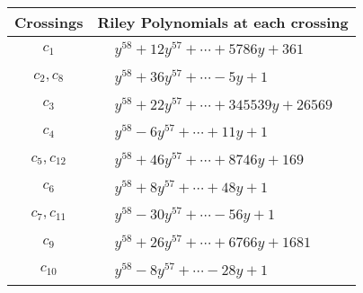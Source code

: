 \documentclass[1p]{elsarticle_modified}
\theoremstyle{definition}
\begin{document}
\begin{tabular}{m{50pt}|m{274pt}}
Crossings & \hspace{64pt}Riley Polynomials at each crossing \\
\hline $$\begin{aligned}c_{1}\end{aligned}$$&$\begin{aligned}
&y^{58}+12 y^{57}+\cdots+5786 y+361
\end{aligned}$\\
\hline $$\begin{aligned}c_{2},c_{8}\end{aligned}$$&$\begin{aligned}
&y^{58}+36 y^{57}+\cdots-5 y+1
\end{aligned}$\\
\hline $$\begin{aligned}c_{3}\end{aligned}$$&$\begin{aligned}
&y^{58}+22 y^{57}+\cdots+345539 y+26569
\end{aligned}$\\
\hline $$\begin{aligned}c_{4}\end{aligned}$$&$\begin{aligned}
&y^{58}-6 y^{57}+\cdots+11 y+1
\end{aligned}$\\
\hline $$\begin{aligned}c_{5},c_{12}\end{aligned}$$&$\begin{aligned}
&y^{58}+46 y^{57}+\cdots+8746 y+169
\end{aligned}$\\
\hline $$\begin{aligned}c_{6}\end{aligned}$$&$\begin{aligned}
&y^{58}+8 y^{57}+\cdots+48 y+1
\end{aligned}$\\
\hline $$\begin{aligned}c_{7},c_{11}\end{aligned}$$&$\begin{aligned}
&y^{58}-30 y^{57}+\cdots-56 y+1
\end{aligned}$\\
\hline $$\begin{aligned}c_{9}\end{aligned}$$&$\begin{aligned}
&y^{58}+26 y^{57}+\cdots+6766 y+1681
\end{aligned}$\\
\hline $$\begin{aligned}c_{10}\end{aligned}$$&$\begin{aligned}
&y^{58}-8 y^{57}+\cdots-28 y+1
\end{aligned}$\\
\hline
\end{tabular}\\~\\
\end{document}
